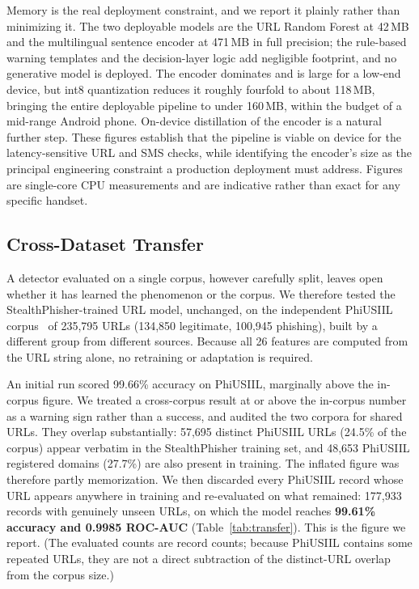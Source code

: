\documentclass[preprint,12pt,number]{elsarticle}
\begin{document}
Memory is the real deployment constraint, and we report it plainly rather than minimizing it. The two deployable models are the URL Random Forest at 42\,MB and the multilingual sentence encoder at 471\,MB in full precision; the rule-based warning templates and the decision-layer logic add negligible footprint, and no generative model is deployed. The encoder dominates and is large for a low-end device, but int8 quantization reduces it roughly fourfold to about 118\,MB, bringing the entire deployable pipeline to under 160\,MB, within the budget of a mid-range Android phone. On-device distillation of the encoder is a natural further step. These figures establish that the pipeline is viable on device for the latency-sensitive URL and SMS checks, while identifying the encoder's size as the principal engineering constraint a production deployment must address. Figures are single-core CPU measurements and are indicative rather than exact for any specific handset.

\subsection{Cross-Dataset Transfer}
A detector evaluated on a single corpus, however carefully split, leaves open whether it has learned the phenomenon or the corpus. We therefore tested the StealthPhisher-trained URL model, unchanged, on the independent PhiUSIIL corpus~\cite{phiusiil} of 235{,}795 URLs (134{,}850 legitimate, 100{,}945 phishing), built by a different group from different sources. Because all 26 features are computed from the URL string alone, no retraining or adaptation is required.

An initial run scored 99.66\% accuracy on PhiUSIIL, marginally above the in-corpus figure. We treated a cross-corpus result at or above the in-corpus number as a warning sign rather than a success, and audited the two corpora for shared URLs. They overlap substantially: 57{,}695 distinct PhiUSIIL URLs (24.5\% of the corpus) appear verbatim in the StealthPhisher training set, and 48{,}653 PhiUSIIL registered domains (27.7\%) are also present in training. The inflated figure was therefore partly memorization. We then discarded every PhiUSIIL record whose URL appears anywhere in training and re-evaluated on what remained: 177{,}933 records with genuinely unseen URLs, on which the model reaches \textbf{99.61\% accuracy and 0.9985 ROC-AUC} (Table~\ref{tab:transfer}). This is the figure we report. (The evaluated counts are record counts; because PhiUSIIL contains some repeated URLs, they are not a direct subtraction of the distinct-URL overlap from the corpus size.)
\end{document}
